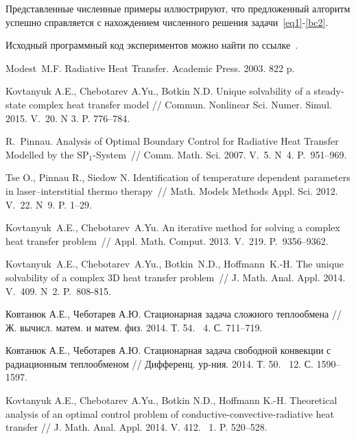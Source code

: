 \documentclass[12pt]{article}
\begin{document}
    Представленные численные примеры иллюстрируют, что предложенный алгоритм успешно справляется
    с нахождением численного решения задачи~\eqref{eq1}-\eqref{bc2}.

    Исходный программный код экспериментов можно найти по ссылке~\cite{mesenev-github}.

    \begin{thebibliography}{999}

        Modest~M.F. Radiative Heat Transfer.
        Academic Press. 2003. 822 p.

        Kovtanyuk A.E., Chebotarev A.Yu., Botkin N.D. Unique solvability of a steady-state complex heat
        transfer model // Commun. Nonlinear Sci. Numer.
        Simul. 2015. V.~20. N 3. P. 776--784.

        R.~Pinnau. Analysis of Optimal Boundary Control for Radiative Heat
        Transfer Modelled by the SP$_1$-System~// Comm.
        Math. Sci. 2007. V.~5. N~4. P.~951--969.

        Tse O., Pinnau R., Siedow N. Identification of temperature
        dependent parameters in laser--interstitial thermo therapy~//
        Math. Models Methods Appl. Sci. 2012. V.~22. N~9. P. 1--29.

        Kovtanyuk~A.E., Chebotarev~A.Yu. An iterative method for solving a
        complex heat transfer problem~// Appl.
        Math. Comput. 2013. V.~219. P.~9356--9362.

        Kovtanyuk~A.E., Chebotarev~A.Yu., Botkin~N.D., Hoffmann~K.-H. The
        unique solvability of a complex 3D heat transfer problem~// J.
        Math. Anal. Appl. 2014. V.~409. N~2. P.~808-815.

        Ковтанюк А.Е., Чеботарев А.Ю. Стационарная задача сложного теплообмена // Ж.
        вычисл. матем. и матем. физ. 2014. Т. 54. \textnumero~4. С. 711--719.

        Ковтанюк А.Е., Чеботарев А.Ю. Стационарная задача свободной конвекции с радиационным теплообменом // Дифференц.
        ур-ния. 2014. Т. 50. \textnumero~12. С. 1590--1597.

        Kovtanyuk A.E., Chebotarev A.Yu., Botkin N.D., Hoffmann K.-H. Theoretical analysis of an optimal
        control problem of conductive-convective-radiative heat transfer // J. Math.
        Anal. Appl. 2014. V. 412. \textnumero~1. P. 520--528.


\end{thebibliography}
\end{document}
